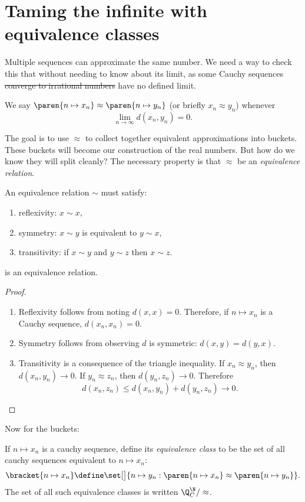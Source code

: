 \documentclass{scrartcl}
\newcommand{\dist}{d}
\begin{document}
\section{Taming the infinite with equivalence classes}
Multiple sequences can approximate the same number. We need a way to check this that without needing to know about its limit, as some Cauchy sequences \sout{converge to irrational numbers} have no defined limit.
\begin{defn}[\(\approx\)]\label{cauchy-eq}
  We say \(\paren{n\mapsto x_{n}}\approx\paren{n\mapsto  y_{n}}\) (or briefly \(x_{n}\approx y_{n}\)) whenever
  \[
    \lim_{{n\to\infty}} \dist(x_{n},y_{n}) = 0.
  \]
\end{defn}

The goal is to use \(\approx\) to collect together equivalent approximations into buckets. These buckets will become our construction of the real numbers. But how do we know they will split cleanly? The necessary property is that \(\approx\) be an \emph{equivalence relation}.
\begin{defn}
  An equivalence relation \(\sim\) must satisfy:
  \begin{enumerate}
    \item reflexivity: \(x\sim x\),
    \item symmetry: \(x\sim y\) is equivalent to \(y\sim x\),
    \item transitivity: if \(x\sim y\) and \(y \sim z\) then \(x\sim z\).
  \end{enumerate}
\end{defn}
\begin{theorem}
   is an equivalence relation.
\end{theorem}
\begin{proof}
  \phantom{M}
  \begin{enumerate}
    \item Reflexivity follows from noting \(\dist(x,x)=0\). Therefore, if \(n \mapsto x_{n}\) is a Cauchy sequence, \(\dist(x_{n},x_{n})=0\).

    \item Symmetry follows from observing \(\dist\) is symmetric: \(\dist(x,y)=\dist(y,x)\).
    \item Transitivity is a consequence of the triangle inequality.
          If \(x_{n}\approx y_{n}\), then \(\dist(x_{n},y_{n})\to 0\). If \(y_{n}\approx z_{n}\), then \(\dist(y_{n},z_{n})\to 0\). Therefore
          \[
          \dist(x_{n},z_{n}) \leq \dist(x_{n},y_{n}) + \dist(y_{n},z_{n}) \to 0.
          \]
  \end{enumerate}
\end{proof}
Now for the buckets:
\begin{defn}
  If \(n\mapsto x_{n}\) is a cauchy sequence, define its \emph{equivalence class} to be the set of all cauchy sequences equivalent to \(n\mapsto x_{n}\):
  \[
    \bracket{n\mapsto x_{n}} \define \set[\big]{n\mapsto y_{n}: \paren{n\mapsto x_{n}}\approx \paren{n\mapsto y_{n}}}.
  \]
  The set of all such equivalence classes is written \(\Q^{\N}_{C}/\approx\).
\end{defn}
\end{document}
